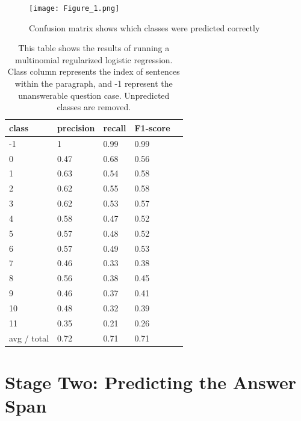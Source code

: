 \begin{figure}
  \texttt{[image: Figure\_1.png]}\centering
  \caption{Confusion matrix shows which classes were predicted correctly}
\end{figure}

\begin{table}[]

\begin{tabular}{lllll}\centering
\hline \textbf{class} & \textbf{precision} & \textbf{recall} & \textbf{F1-score} \\ \hline

 -1	&	1	&	0.99	&	0.99		\\ 
0	&	0.47	&	0.68	&	0.56		\\
1	&	0.63	&	0.54	&	0.58	\\
2	&	0.62	&	0.55	&	0.58		\\
3	&	0.62	&	0.53	&	0.57		\\
4	&	0.58	&	0.47	&	0.52		\\
5	&	0.57	&	0.48	&	0.52		\\
6	&	0.57	&	0.49	&	0.53		\\
7	&	0.46	&	0.33	&	0.38	\\
8	&	0.56	&	0.38	&	0.45		\\
9	&	0.46	&	0.37	&	0.41		\\
10	&	0.48	&	0.32	&	0.39	\\
11	&	0.35	&	0.21	&	0.26		\\
\hline avg / total	&	0.72	&	0.71	&	0.71		\\ \hline

\end{tabular}
\caption{This table shows the results of running a multinomial regularized logistic regression. Class column represents the index of sentences within the paragraph, and -1 represent the unanswerable question case. Unpredicted classes are removed.}
\label{my-label}

\end{table}

\newpage

\section{Stage Two: Predicting the Answer Span}
